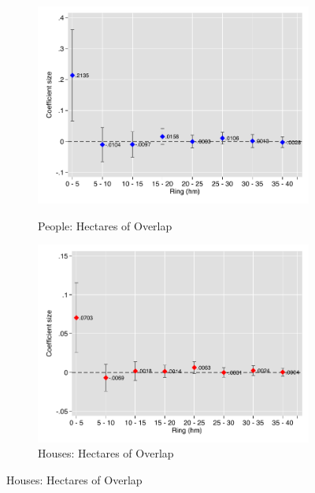 \documentclass[12pt]{article}
\begin{document}
\begin{figure}[hbtp]
    \caption{Coefficients on Post $\times$ Constructed Project Overlap with Rings around Plots}
    \centering
    \vspace{2mm}
    \label{fig:gr_coef_w_sd}
    \begin{subfigure}[b]{.49\textwidth}
        \centering
        \caption[]{ \small People: Hectares of Overlap }  
        \vspace{-1mm}
        \includegraphics[width=\textwidth,trim={.2cm .2cm .2cm 0cm}, clip=true]{figures/gr_pop.pdf}
        \label{fig:gr_pop}
    \end{subfigure}
    \hfill
    \begin{subfigure}[b]{.49\textwidth}  
        \centering 
        \caption[]{ \small  Houses: Hectares of Overlap }
        \vspace{-1mm}
        \includegraphics[width=\textwidth,trim={.2cm .2cm .2cm 0cm}, clip=true]{figures/gr_house.pdf}

\end{subfigure}
\end{figure}
\end{document}
